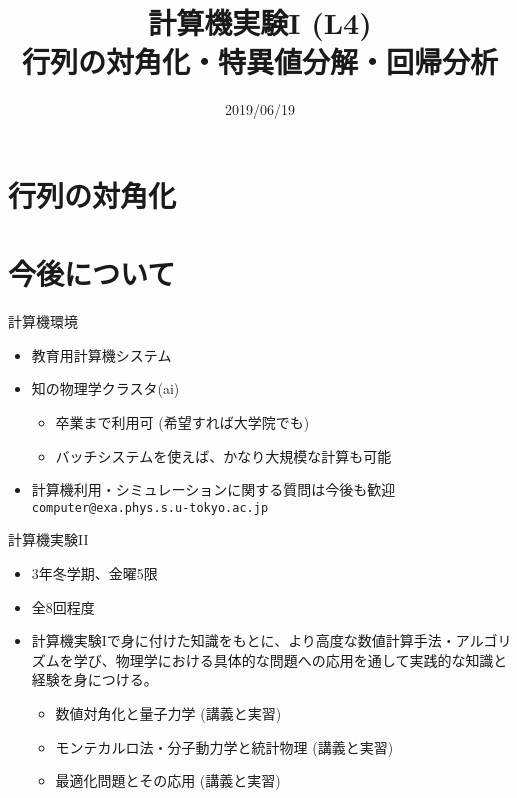 \documentclass[dvipdfmx]{beamer}
\title{計算機実験I (L4) \\ 行列の対角化・特異値分解・回帰分析}
\date{2019/06/19}
\begin{document}
\begin{frame}
  \titlepage
  \tableofcontents
\end{frame}

\section{行列の対角化}














\section{今後について}

\begin{frame}[t,fragile]{計算機環境}
  \begin{itemize}
    \setlength{\itemsep}{1em}
  \item 教育用計算機システム
  \item 知の物理学クラスタ(ai)
    \begin{itemize}
    \item 卒業まで利用可 (希望すれば大学院でも)
    \item バッチシステムを使えば、かなり大規模な計算も可能
    \end{itemize}
  \item 計算機利用・シミュレーションに関する質問は今後も歓迎 {\tt computer@exa.phys.s.u-tokyo.ac.jp}
  \end{itemize}
\end{frame}

\begin{frame}[t,fragile]{計算機実験II}
  \begin{itemize}
    \setlength{\itemsep}{1em}
  \item 3年冬学期、金曜5限
  \item 全8回程度
  \item 計算機実験Iで身に付けた知識をもとに、より高度な数値計算手法・アルゴリズムを学び、物理学における具体的な問題への応用を通して実践的な知識と経験を身につける。
    \begin{itemize}
      \item 数値対角化と量子力学 (講義と実習)
      \item モンテカルロ法・分子動力学と統計物理 (講義と実習)
      \item 最適化問題とその応用 (講義と実習)
    \end{itemize}
  \end{itemize}
\end{frame}
\end{document}
